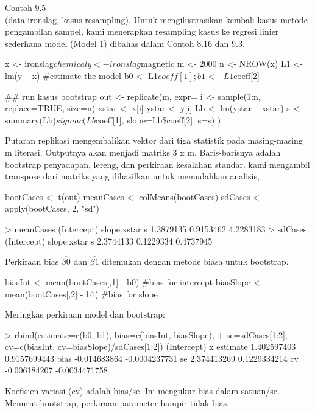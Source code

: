 \documentclass[a4paper,12pt]{article}
\theoremstyle{definition}
\begin{document}
Contoh 9.5\\
(data ironslag, kasus resampling). Untuk mengilustrasikan kembali kasus-metode pengambilan sampel, kami menerapkan resampling kasus ke regresi linier sederhana model (Model 1) dibahas dalam Contoh 8.16 dan 9.3.\\
\begin{spverbatim}
x <- ironslag$chemical
y <- ironslag$magnetic
m <- 2000
n <- NROW(x)
L1 <- lm(y ~ x) #estimate the model
b0 <- L1$coeff[1]; b1 <- L1$coeff[2]

## run kasus bootstrap
out <- replicate(m, expr={
    i <- sample(1:n, replace=TRUE, size=n)
    xstar <- x[i]
    ystar <- y[i]
    Lb <- lm(ystar ~ xstar)
    s <- summary(Lb)$sigma
    c(Lb$coeff[1], slope=Lb\$coeff[2], s=s)
})
\end{spverbatim} 

Putaran replikasi mengembalikan vektor dari tiga statistik pada masing-masing m literasi. Outputnya akan menjadi matriks 3 x m. Baris-barisnya adalah bootstrap penyadapan, lereng, dan perkiraan kesalahan standar. kami mengambil transpose dari matriks yang dihasilkan untuk memudahkan analisis,
\begin{spverbatim}
bootCases <- t(out)
meanCases <- colMeans(bootCases)
sdCases <- apply(bootCases, 2, "sd")

> meanCases
(Intercept) slope.xstar s
1.3879135 0.9153462 4.2283183
> sdCases
(Intercept) slope.xstar s
2.3744133 0.1229334 0.4737945
\end{spverbatim}
Perkiraan bias $\widehat{\beta0}$ dan $\widehat{\beta1}$ ditemukan dengan metode biasa untuk bootstrap.\\
\begin{spverbatim}
biasInt <- mean(bootCases[,1] - b0) #bias for intercept
biasSlope <- mean(bootCases[,2] - b1) #bias for slope
\end{spverbatim}
Meringkas perkiraan model dan bootstrap:
\begin{spverbatim}
> rbind(estimate=c(b0, b1), bias=c(biasInt, biasSlope),
+ se=sdCases[1:2], cv=c(biasInt, cv=biasSlope)/sdCases[1:2])
(Intercept) x
estimate 1.402597403 0.9157699443
bias -0.014683864 -0.0004237731
se 2.374413269 0.1229334214
cv -0.006184207 -0.0034471758
\end{spverbatim}
Koefisien variasi (cv) adalah bias/se. Ini mengukur bias dalam satuan/se. Menurut bootstrap, perkiraan parameter hampir tidak bias.\\
\end{document}
